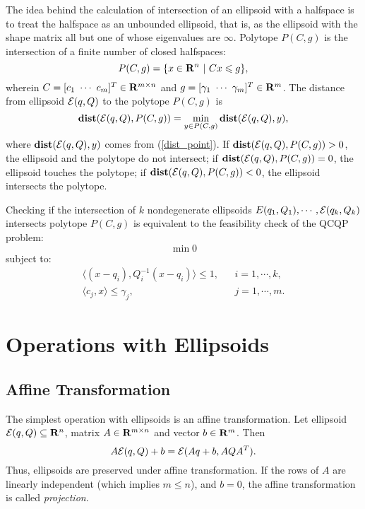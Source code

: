 The idea behind the calculation of intersection of an ellipsoid with a
halfspace is to treat the halfspace as an unbounded ellipsoid, that is, as the
ellipsoid with the shape matrix  all but one of whose eigenvalues are $\infty$.
\bd
Polytope $P(C,g)$ is the  intersection of a finite number
of closed halfspaces:
\begin{equation}
P(C,g) = \{x\in{\bf R}^n ~|~ Cx\leq g\},  \label{polytope}
\end{equation}
wherein $C=[c_1 ~ \cdots ~ c_m]^T\in{\bf R}^{m\times n}$ and
$g=[\gamma_1 ~ \cdots ~ \gamma_m]^T\in{\bf R}^m$.
\ed
The distance from ellipsoid $\EE(q,Q)$ to the polytope $P(C,g)$ is
\begin{equation}
{\bf dist}(\EE(q,Q),P(C,g))=\min_{y\in P(C,g)}{\bf dist}(\EE(q,Q),y),
\label{dist_poly}
\end{equation}
where ${\bf dist}(\EE(q,Q),y)$ comes from (\ref{dist_point}).
If ${\bf dist}(\EE(q,Q),P(C,g))>0$, the ellipsoid and the polytope
do not intersect;
if ${\bf dist}(\EE(q,Q),P(C,g))=0$, the ellipsoid touches the polytope;
if ${\bf dist}(\EE(q,Q),P(C,g))<0$, the ellipsoid intersects the
polytope.

Checking if the intersection of $k$ nondegenerate ellipsoids
$E(q_1,Q_1),\cdots,\EE(q_k,Q_k)$ intersects  polytope $P(C,g)$
is equivalent to the feasibility check of the QCQP problem:
\[ \min 0 \]
subject to:
\begin{eqnarray*}
\langle (x-q_i),Q_i^{-1}(x-q_i)\rangle \leq 1, & & i=1,\cdots,k,\\
\langle c_j, x\rangle \leq \gamma_j, & & j=1,\cdots,m.
\end{eqnarray*}























\section{Operations with Ellipsoids}
\subsection{Affine Transformation}
The simplest operation with ellipsoids is an affine transformation.
Let ellipsoid $\EE(q,Q)\subseteq{\bf R}^n$, matrix $A\in{\bf R}^{m\times n}$
and vector $b\in{\bf R}^m$. Then
\begin{equation}
A\EE(q,Q) + b = \EE(Aq+b, AQA^T) .\label{affinetrans}
\end{equation}
Thus, ellipsoids are preserved under affine transformation.
If the rows of $A$ are linearly independent (which implies  $m\leq n$), and
$b=0$, the affine transformation is called {\it projection}.











